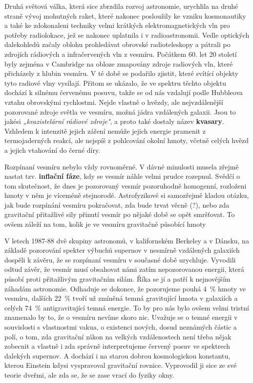         Druhá světová válka, která sice zbrzdila rozvoj astronomie, urychlila na druhé straně vývoj
        mohutných raket, které nakonec posloužily ke vzniku kosmonautiky a také ke zdokonaleni
        techniky velmi krátkých elektromagnetických vln pro potřeby radiolokace, jež se nakonec
        uplatnila i v radioastronomii. Vedle optických dalekohledů začaly oblohu prohledávat
        obrovské radioteleskopy a pátrali po zdrojích rádiových a infračervených vln z vesmíru.
        Počátkem 60. let 20 století byly zejména v Cambridge na obloze zmapovány zdroje radiových
        vln, které přicházely z hlubin vesmíru. V té době se podařilo zjistit, které svítící objekty
        tyto radiové vlny vysílají. Přitom se ukázalo, že ve spektru těchto objektu dochází k
        silnému červenému posuvu, takže se od nás vzdalují podle Hubbleova vztahu obrovskými
        rychlostmi. Nejde vlastně o hvězdy, ale nejvzdálenější pozorované zdroje světla ve vesmíru,
        možná jádra vzdálených galaxii. Jsou to jakési \emph{„kvazistelární rádiové zdroje"}, a
        proto také dostaly název \textbf{kvasary}. Vzhledem k intenzitě jejich záření nemůže jejich
        energie pramenit z termojaderných reakcí, ale nejspíš z pohlcování okolní hmoty, včetně
        celých hvězd a jejich vtahování do černé díry.

        Rozpínaní vesmíru nebylo vždy rovnoměrné. V dávné minulosti musela zřejmě nastat tzv.
        \textbf{inflační fáze}, kdy se vesmír náhle velmi prudce rozepnul. Svědčí o tom skutečnost,
        že dnes je pozorovaný vesmír pozoruhodně homogenní, rozloženi hmoty v něm je víceméně
        stejnorodé. Astrofyzikové si samozřejmě kladou otázku, jak bude rozpínání vesmíru
        pokračovat, zda bude trvat věcně (?), nebo zda gravitační přitažlivé sily přinutí vesmír po
        nějaké době se opět smršťovat. To ovšem záleží na tom, kolik je ve vesmíru gravitačně
        působící hmoty
        
        V letech 1987-88 dvě skupiny astronomů, v kalifornském Berkeley a v Dánsku, na základě
        pozorování spekter výbuchů supernov v nesmírně vzdálených galaxiích dospěli k závěru, že se
        rozpínaní vesmíru v současné době urychluje. Vyvodili odtud závěr, že vesmír musí obsahovat
        námi zatím nepozorovanou energii, která působí proti přitažlivým gravitačním silám. Říka se
        jí \emph{} a patří k nejnovějším záhadám astronomie. Odhaduje se dokonce,
        že pozorujeme pouhá \SI{4}{\percent} hmoty ve vesmíru, dalších \SI{22}{\percent} tvoří už
        zmíněná temná gravitující hmota v galaxiích a celých \SI{74}{\percent}  antigravitující
        temná energie. To by pro nás bylo ovšem velmi tristní znamenalo by to, že o vesmíru nevíme
        skoro nic. Uvažuje se o temné energii v souvislosti s vlastnostmi vakua, o existenci nových,
        dosud neznámých částic a polí, o tom, zda gravitační zákon na velkých vzdálenostech není
        třeba nějak zobecnit a vlastně i zda správně interpretujeme červený posuv ve spektrech
        dalekých supernov. A dochází i na starou dobrou kosmologickou konstantu, kterou Einstein
        kdysi vyspravoval gravitační rovnice. Vyprovodil ji sice ze své teorie dveřmi, ale zda se,
        že se zase vrací do fyziky okny.
        
